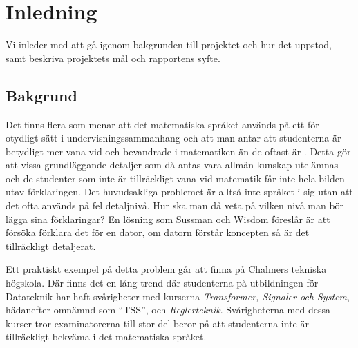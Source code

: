 \documentclass[]{article}
\begin{document}
\newpage


\newpage
\tableofcontents

\newpage

\printglossary[title=Ordlista,nonumberlist]

\newpage

\setlength{\parskip}{2mm}
\setlength{\parindent}{0pt}


\section{Inledning}
Vi inleder med att gå igenom bakgrunden till projektet och hur det
uppstod, samt beskriva projektets mål och rapportens syfte.

\subsection{Bakgrund}
%

Det finns flera som menar att det matematiska språket används på ett för
otydligt sätt i undervisningssammanhang och att man antar att studenterna
är betydligt mer vana vid och bevandrade i matematiken än de oftast är
\cite{sussman2002role} \cite{wells1995communicating}.
Detta gör att vissa grundläggande detaljer som då antas vara allmän kunskap
utelämnas och de studenter som inte är tillräckligt vana vid matematik får inte
hela bilden utav förklaringen.
Det huvudsakliga problemet är alltså inte språket i sig utan att det ofta
används på fel detaljnivå. Hur ska man då veta på vilken nivå man bör lägga
sina förklaringar? En lösning som Sussman och Wisdom föreslår är att
försöka förklara det för en dator, om datorn förstår koncepten så är det
tillräckligt detaljerat.

Ett praktiskt exempel på detta problem går att finna på Chalmers tekniska högskola.
Där finns det en lång trend där studenterna på utbildningen för Datateknik har
haft svårigheter med kurserna \textit{Transformer, Signaler och System}, hädanefter
omnämnd som ``\gls{TSS}'', och \textit{Reglerteknik}.
Svårigheterna med dessa kurser tror examinatorerna till stor del beror på att
studenterna inte är tillräckligt bekväma i det matematiska språket.
\end{document}
